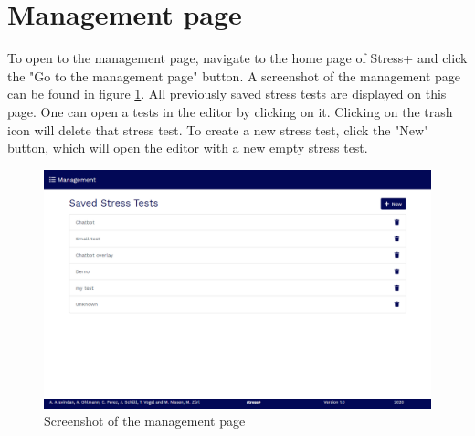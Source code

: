 \section{Management page}
\label{sec:management-page}

To open to the management page, navigate to the home page of Stress+ and click the "Go to the management page" button.
A screenshot of the management page can be found in figure \ref{fig:screenshot-management-page}.
All previously saved stress tests are displayed on this page.
One can open a tests in the editor by clicking on it.
Clicking on the trash icon will delete that stress test.
To create a new stress test, click the "New" button, which will open the editor with a new empty stress test.

\begin{figure}[htb]
    \centering
    \includegraphics[width=\textwidth]{figures/screenshot-management-page.png}
    \caption{Screenshot of the management page}
    \label{fig:screenshot-management-page}
\end{figure}
